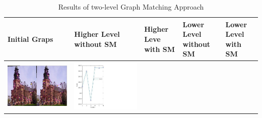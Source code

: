 \documentclass[
	fontsize=12pt,
	paper=a4,
	twoside=false,
	numbers=noenddot,
	plainheadsepline,
	toc=listof,
	toc=bibliography
]{scrartcl}
\begin{document}
\newpage
\begin{landscape}
	
\begin{table}
	[ht] \caption{Results of two-level Graph Matching Approach } \label{tab:stimuli}
	\begin{tabular}
		{|L{4cm}|L{3cm}|L{3cm}|L{6cm}|L{6cm}|} \hline
		Initial Graps & Higher Level without SM  & Higher Leve with SM &  Lower Level without SM &  Lower Level with SM \\ \hline
		\rule{0pt}{5cm}
		\parbox[t]{1em}{
			\includegraphics[scale = 0.2]{fig/initial_graphs1.jpg}}  & 
		\parbox[b]{1em}{
			\includegraphics[scale = 0.28]{fig/method1/test1/accuracy_HL.jpg}}  & 

\end{tabular}
\end{table}
\end{landscape}
\end{document}
